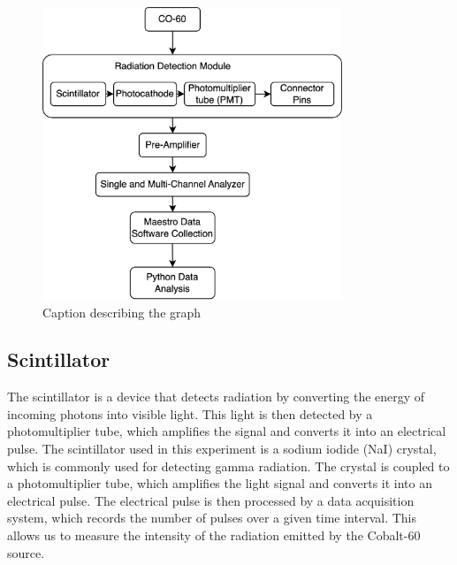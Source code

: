\documentclass[12pt]{article}
\begin{document}
            \begin{figure}
                \centering
                \includegraphics[width=0.8\textwidth]{./img/other/Lab1 Apparatus.png}
                \caption{Caption describing the graph}
                \label{fig:graph1}
            \end{figure}


        \subsection{Scintillator}
            The scintillator is a device that detects radiation by converting the energy of incoming photons into visible light. 
            This light is then detected by a photomultiplier tube, which amplifies the signal and converts it into an electrical pulse. 
            The scintillator used in this experiment is a sodium iodide (NaI) crystal, which is commonly used for detecting gamma radiation. 
            The crystal is coupled to a photomultiplier tube, which amplifies the light signal and converts it into an electrical pulse. 
            The electrical pulse is then processed by a data acquisition system, which records the number of pulses over a given time interval. 
            This allows us to measure the intensity of the radiation emitted by the Cobalt-60 source.
\end{document}
